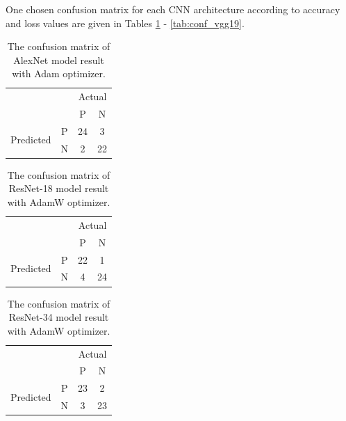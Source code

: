 One chosen confusion matrix for each CNN architecture according to accuracy and loss values are given in Tables \ref{tab:conf_alexnet} - \ref{tab:conf_vgg19}.

\begin{table}[!h]
	\centering
	\caption{The confusion matrix of AlexNet model result with Adam optimizer.}
	\label{tab:conf_alexnet}
	\begin{tabular}{cc|c|c|}
		\cline{3-4}
		&   & \multicolumn{2}{c|}{Actual} \\ \cline{3-4} 
		&   & P            & N            \\ \hline
		\multicolumn{1}{|c|}{\multirow{2}{*}{Predicted}} & P & 24           & 3            \\ \cline{2-4} 
		\multicolumn{1}{|c|}{}                           & N & 2            & 22           \\ \hline
	\end{tabular}
\end{table}

\begin{table}[!h]
	\centering
	\caption{The confusion matrix of ResNet-18 model result with AdamW optimizer.}
	\label{tab:conf_resnet18}
	\begin{tabular}{cc|c|c|}
		\cline{3-4}
		&   & \multicolumn{2}{c|}{Actual} \\ \cline{3-4} 
		&   & P            & N            \\ \hline
		\multicolumn{1}{|c|}{\multirow{2}{*}{Predicted}} & P & 22           & 1            \\ \cline{2-4} 
		\multicolumn{1}{|c|}{}                           & N & 4            & 24           \\ \hline
	\end{tabular}
\end{table}

\begin{table}[!h]
	\centering
	\caption{The confusion matrix of ResNet-34 model result with AdamW optimizer.}
	\label{tab:conf_resnet34}
	\begin{tabular}{cc|c|c|}
		\cline{3-4}
		&   & \multicolumn{2}{c|}{Actual} \\ \cline{3-4} 
		&   & P            & N            \\ \hline
		\multicolumn{1}{|c|}{\multirow{2}{*}{Predicted}} & P & 23           & 2            \\ \cline{2-4} 
		\multicolumn{1}{|c|}{}                           & N & 3            & 23           \\ \hline
	\end{tabular}
\end{table}

